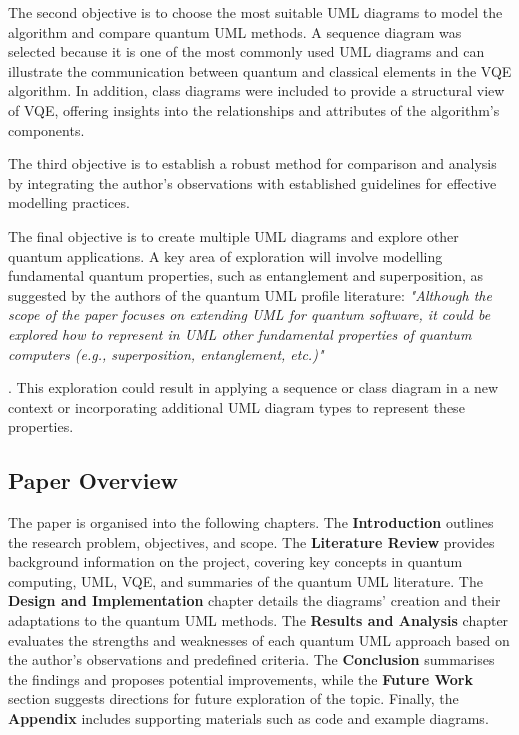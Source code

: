 \documentclass{article}
\begin{document}
The second objective is to choose the most suitable UML diagrams to model the algorithm and compare quantum UML methods. A sequence diagram was selected because it is one of the most commonly used UML diagrams and can illustrate the communication between quantum and classical elements in the VQE algorithm. In addition, class diagrams were included to provide a structural view of VQE, offering insights into the relationships and attributes of the algorithm's components.

The third objective is to establish a robust method for comparison and analysis by integrating the author's observations with established guidelines for effective modelling practices.

The final objective is to create multiple UML diagrams and explore other quantum applications. A key area of exploration will involve modelling fundamental quantum properties, such as entanglement and superposition, as suggested by the authors of the quantum UML profile literature: \textit{"Although the scope of the paper focuses on extending UML for quantum software, it
could be explored how to represent in UML other fundamental properties of quantum
computers (e.g., superposition, entanglement, etc.)"}{\cite{Pérez-Castillo2022}. This exploration could result in applying a sequence or class diagram in a new context or incorporating additional UML diagram types to represent these properties.

\subsection{Paper Overview}

The paper is organised into the following chapters. The \textbf{Introduction} outlines the research problem, objectives, and scope. The \textbf{Literature Review} provides background information on the project, covering key concepts in quantum computing, UML, VQE, and summaries of the quantum UML literature. The \textbf{Design and Implementation} chapter details the diagrams' creation and their adaptations to the quantum UML methods. The \textbf{Results and Analysis} chapter evaluates the strengths and weaknesses of each quantum UML approach based on the author’s observations and predefined criteria. The \textbf{Conclusion} summarises the findings and proposes potential improvements, while the \textbf{Future Work} section suggests directions for future exploration of the topic. Finally, the \textbf{Appendix} includes supporting materials such as code and example diagrams.

}
\end{document}
